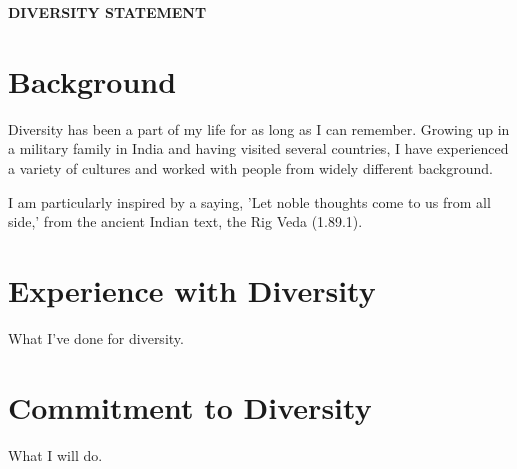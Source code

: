 \documentclass[12pt]{article}
\begin{document}
 \sloppy %
\begin{center}
{\large \uppercase{\textbf{Diversity Statement}}}
\end{center}

\section*{Background}
Diversity has been a part of my life for as long as I can remember. Growing up in a military family in India and having visited several countries, I have experienced a variety of cultures and worked with people from widely different background. 

I am particularly inspired by a saying, 'Let noble thoughts come to us from all side,' from the ancient Indian text, the Rig Veda (1.89.1).

\section*{Experience with Diversity}
What I've done for diversity.

\section*{Commitment to Diversity}
What I will do.
\end{document}
